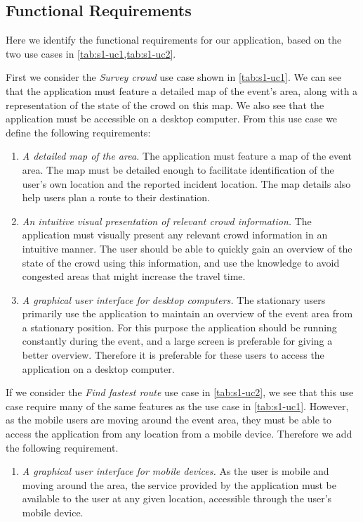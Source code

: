 \subsection{Functional Requirements} \label{ss:s1_freqs}
Here we identify the functional requirements for our application, based on the two use cases in \cref{tab:s1-uc1,tab:s1-uc2}. 

First we consider the \emph{Survey crowd} use case shown in \cref{tab:s1-uc1}. We can see that the application must feature a detailed map of the event's area, along with a representation of the state of the crowd on this map. We also see that the application must be accessible on a desktop computer. From this use case we define the following requirements:

\begin{enumerate}
    \item \emph{A detailed map of the area.} The application must feature a map of the event area. The map must be detailed enough to facilitate identification of the user's own location and the reported incident location. The map details also help users plan a route to their destination.
    \item \emph{An intuitive visual presentation of relevant crowd information.} The application must visually present any relevant crowd information in an intuitive manner. The user should be able to quickly gain an overview of the state of the crowd using this information, and use the knowledge to avoid congested areas that might increase the travel time.
    \item \emph{A graphical user interface for desktop computers.} The stationary users primarily use the application to maintain an overview of the event area from a stationary position. For this purpose the application should be running constantly during the event, and a large screen is preferable for giving a better overview. Therefore it is preferable for these users to access the application on a desktop computer.
\end{enumerate}

If we consider the \emph{Find fastest route} use case in \cref{tab:s1-uc2}, we see that this use case require many of the same features as the use case in \cref{tab:s1-uc1}. However, as the mobile users are moving around the event area, they must be able to access the application from any location from a mobile device. Therefore we add the following requirement.

\begin{enumerate}[resume]
    \item \emph{A graphical user interface for mobile devices.} As the user is mobile and moving around the area, the service provided by the application must be available to the user at any given location, accessible through the user's mobile device.

\end{enumerate}


